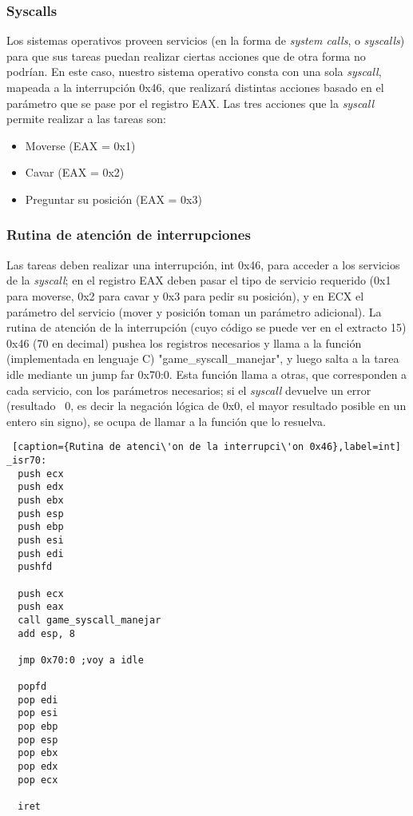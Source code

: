 \subsubsection*{Syscalls}
\par Los sistemas operativos proveen servicios (en la forma de \textit{system calls}, o \textit{syscalls}) para que sus tareas puedan realizar ciertas acciones que de otra forma no podr\'ian. En este caso, nuestro sistema operativo consta con una sola \textit{syscall}, mapeada a la interrupci\'on 0x46, que realizar\'a distintas acciones basado en el par\'ametro que se pase por el registro EAX.
Las tres acciones que la \textit{syscall} permite realizar a las tareas son:
\begin{itemize}
    \item Moverse (EAX = 0x1)
    \item Cavar (EAX = 0x2)
    \item Preguntar su posici\'on (EAX = 0x3)
\end{itemize}

\subsubsection*{Rutina de atenci\'on de interrupciones}
\par Las tareas deben realizar una interrupci\'on, int 0x46, para acceder a los servicios de la \textit{syscall}; en el registro EAX deben pasar el tipo de servicio requerido (0x1 para moverse, 0x2 para cavar y 0x3 para pedir su posici\'on), y en ECX el par\'ametro del servicio (mover y posici\'on toman un par\'ametro adicional).
La rutina de atenci\'on de la interrupci\'on (cuyo c\'odigo se puede ver en el extracto 15) 0x46 (70 en decimal) pushea los registros necesarios y llama a la funci\'on (implementada en lenguaje C) "game\_syscall\_manejar", y luego salta a la tarea idle mediante un jump far 0x70:0. Esta funci\'on llama a otras, que corresponden a cada servicio, con los par\'ametros necesarios; si el \textit{syscall} devuelve un error (resultado ~0, es decir la negaci\'on l\'ogica de 0x0, el mayor resultado posible en un entero sin signo), se ocupa de llamar a la funci\'on que lo resuelva.

\begin{lstlisting} [caption={Rutina de atenci\'on de la interrupci\'on 0x46},label=int]
_isr70:
  push ecx
  push edx
  push ebx
  push esp
  push ebp
  push esi
  push edi
  pushfd
  
  push ecx
  push eax
  call game_syscall_manejar
  add esp, 8

  jmp 0x70:0 ;voy a idle
 
  popfd
  pop edi
  pop esi
  pop ebp
  pop esp
  pop ebx
  pop edx
  pop ecx
  
  iret

\end{lstlisting}




